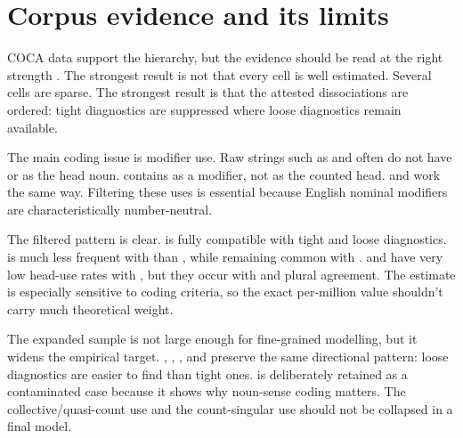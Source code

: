 \documentclass[12pt,a4paper]{article}
\begin{document}
\section{Corpus evidence and its limits}\label{sec:evidence-v3}

COCA data support the hierarchy, but the evidence should be read at the right strength \citep{davies2020coca}. The strongest result is not that every cell is well estimated. Several cells are sparse. The strongest result is that the attested dissociations are ordered: tight diagnostics are suppressed where loose diagnostics remain available.



The main coding issue is modifier use. Raw strings such as  and  often do not have  or  as the head noun.  contains  as a modifier, not as the counted head.  and  work the same way. Filtering these uses is essential because English nominal modifiers are characteristically number-neutral.



The filtered pattern is clear.  is fully compatible with tight and loose diagnostics.  is much less frequent with  than , while remaining common with .  and  have very low head-use rates with , but they occur with  and plural agreement. The  estimate is especially sensitive to coding criteria, so the exact per-million value shouldn't carry much theoretical weight.



The expanded sample is not large enough for fine-grained modelling, but it widens the empirical target. , , , and  preserve the same directional pattern: loose diagnostics are easier to find than tight ones.  is deliberately retained as a contaminated case because it shows why noun-sense coding matters. The collective/quasi-count use and the count-singular use  should not be collapsed in a final model.
\end{document}
